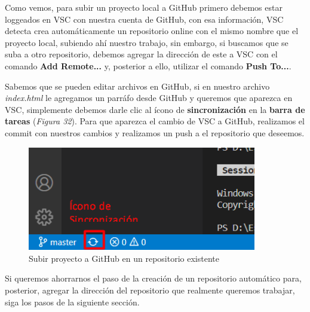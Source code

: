 Como vemos, para subir un proyecto local a GitHub primero debemos estar loggeados en VSC con nuestra cuenta de GitHub, con esa información, VSC detecta crea automáticamente un repositorio online con el mismo nombre que el proyecto local, subiendo ahí nuestro trabajo, sin embargo, si buscamos que se suba a otro repositorio, debemos agregar la dirección de este a VSC con el comando \textbf{Add Remote...} y, posterior a ello, utilizar el comando \textbf{Push To...}.

Sabemos que se pueden editar archivos en GitHub, si en nuestro archivo \textit{index.html} le agregamos un parráfo desde GitHub y queremos que aparezca en VSC, simplemente debemos darle clic al ícono de \textbf{sincronización} en la \textbf{barra de tareas} (\textit{Figura 32}). Para que aparezca el cambio de VSC a GitHub, realizamos el commit con nuestros cambios y realizamos un push a el repositorio que deseemos.
\begin{figure}[H]
    \begin{center}
        \caption{Subir proyecto a GitHub en un repositorio existente}
        \label{fig: 32}
        \includegraphics[width=10cm]{capturas/sincronizacion.png}
    \end{center}
\end{figure}

Si queremos ahorrarnos el paso de la creación de un repositorio automático para, posterior, agregar la dirección del repositorio que realmente queremos trabajar, siga los pasos de la siguiente sección.



